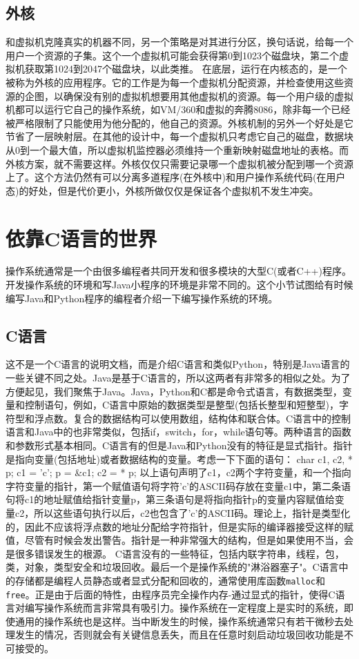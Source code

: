 	\subsection{外核}
	
	和虚拟机克隆真实的机器不同，另一个策略是对其进行分区，换句话说，给每一个用户一个资源的子集。这个一个虚拟机可能会获得第0到1023个磁盘块，第二个虚拟机获取第1024到2047个磁盘块，以此类推。
	在底层，运行在内核态的，是一个被称为外核的应用程序。它的工作是为每一个虚拟机分配资源，并检查使用这些资源的企图，以确保没有别的虚拟机想要用其他虚拟机的资源。每一个用户级的虚拟机都可以运行它自己的操作系统，如VM/360和虚拟的奔腾8086，除非每一个已经被严格限制了只能使用为他分配的，他自己的资源。外核机制的另外一个好处是它节省了一层映射层。在其他的设计中，每一个虚拟机只考虑它自己的磁盘，数据块从0到一个最大值，所以虚拟机监控器必须维持一个重新映射磁盘地址的表格。而外核方案，就不需要这样。外核仅仅只需要记录哪一个虚拟机被分配到哪一个资源上了。这个方法仍然有可以分离多道程序(在外核中)和用户操作系统代码(在用户态)的好处，但是代价更小，外核所做仅仅是保证各个虚拟机不发生冲突。
	
	\section{依靠C语言的世界}
	
	操作系统通常是一个由很多编程者共同开发和很多模块的大型C(或者C++)程序。开发操作系统的环境和写Java小程序的环境是非常不同的。这个小节试图给有时候编写Java和Python程序的编程者介绍一下编写操作系统的环境。
	
	\subsection{C语言}

	这不是一个C语言的说明文档，而是介绍C语言和类似Python，特别是Java语言的一些关键不同之处。Java是基于C语言的，所以这两者有非常多的相似之处。为了方便起见，我们聚焦于Java。Java，Python和C都是命令式语言，有数据类型，变量和控制语句，例如，C语言中原始的数据类型是整型(包括长整型和短整型)，字符型和浮点数。复合的数据结构可以使用数组，结构体和联合体。C语言中的控制语言和Java中的也非常类似，包括if，switch，for，while语句等。两种语言的函数和参数形式基本相同。C语言有的但是Java和Python没有的特征是显式指针。指针是指向变量(包括地址)或者数据结构的变量。考虑一下下面的语句：
	char c1, c2, * p;
	c1 = ’c’;
	p = \&c1;
	c2 = * p;
	以上语句声明了c1，c2两个字符变量，和一个指向字符变量的指针，第一个赋值语句将字符'c'的ASCII码存放在变量c1中，第二条语句将c1的地址赋值给指针变量p，第三条语句是将指向指针p的变量内容赋值给变量c2，所以这些语句执行以后，c2也包含了'c'的ASCII码。理论上，指针是类型化的，因此不应该将浮点数的地址分配给字符指针，但是实际的编译器接受这样的赋值，尽管有时候会发出警告。指针是一种非常强大的结构，但是如果使用不当，会是很多错误发生的根源。
	C语言没有的一些特征，包括内联字符串，线程，包，类，对象，类型安全和垃圾回收。最后一个是操作系统的"淋浴器塞子"。C语言中的存储都是编程人员静态或者显式分配和回收的，通常使用库函数\texttt{malloc}和\texttt{free}。正是由于后面的特性，由程序员完全操作内存-通过显式的指针，使得C语言对编写操作系统而言非常具有吸引力。操作系统在一定程度上是实时的系统，即使通用的操作系统也是这样。当中断发生的时候，操作系统通常只有若干微秒去处理发生的情况，否则就会有关键信息丢失，而且在任意时刻启动垃圾回收功能是不可接受的。
	
